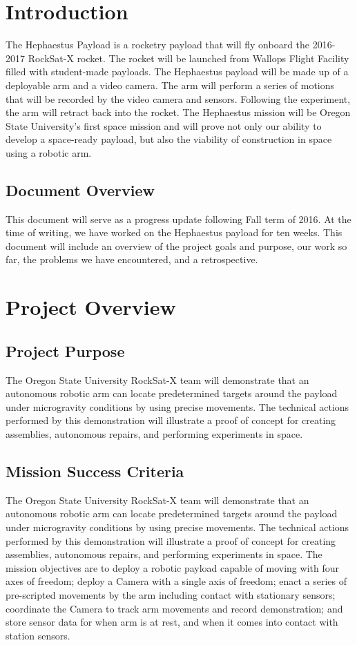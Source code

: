 \documentclass[letterpaper,10pt]{article}
\begin{document}
\section{Introduction}
The Hephaestus Payload is a rocketry \gls{payload} that will fly onboard the 2016-2017 RockSat-X rocket. 
The rocket will be launched from Wallops Flight Facility filled with
student-made \glspl{payload}. 
The Hephaestus \gls{payload} will be made up of a \gls{deployable} arm and a video camera. The arm will perform 
a series of motions that will be recorded by the video camera and sensors. Following the experiment, the 
arm will retract back into the rocket. The Hephaestus mission will be Oregon State University's first 
space mission and will prove not only our ability to develop a space-ready
\gls{payload}, but also the 
viability of construction in space using a robotic arm.

\subsection{Document Overview}
This document will serve as a progress update following Fall term of 2016. At the time of writing, we 
have worked on the Hephaestus \gls{payload} for ten weeks. This document will include an overview of the 
project goals and purpose, our work so far, the problems we have encountered, and a retrospective.

\section{Project Overview}
\subsection{Project Purpose}
The Oregon State University RockSat-X team will demonstrate that an autonomous robotic arm can locate predetermined
 targets around the \gls{payload} under microgravity conditions by using precise movements. 
The technical actions performed by this demonstration will illustrate a proof of concept for creating assemblies, 
autonomous repairs, and performing experiments in space.
\subsection{Mission Success Criteria}
The Oregon State University RockSat-X team will demonstrate that an autonomous robotic arm can locate predetermined targets around the 
\gls{payload} under microgravity conditions by using precise movements. The technical actions performed by this demonstration will illustrate 
a proof of concept for creating assemblies, autonomous repairs, and performing experiments in space. 
The mission objectives are to deploy a robotic \gls{payload} capable of moving with four axes of freedom; deploy a Camera with a single axis 
of freedom;
enact a series of pre-scripted movements by the arm including contact with stationary sensors;
coordinate the Camera to track arm movements and record demonstration; and
store sensor data for when arm is at rest, and when it comes into contact with station sensors.
\end{document}

